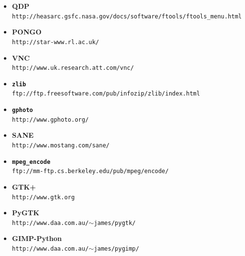 \documentclass[twoside,11pt]{article}
\newcommand{\htmladdnormallink}[2]{#1}
\begin{document}
\begin{itemize}
\item {\bf\label{sc15_available_qdp}QDP}\\
\htmladdnormallink{{\tt http://heasarc.gsfc.nasa.gov/docs/software/ftools/ftools\_menu.html}}{http://heasarc.gsfc.nasa.gov/docs/software/ftools/ftools\_menu.html}
 
\item {\bf\label{sc15_available_pongo}PONGO}\\
\htmladdnormallink{{\tt http://star-www.rl.ac.uk/}}{http://star-www.rl.ac.uk/}  

\item {\bf\label{sc15_available_vnc}VNC}\\
\htmladdnormallink{{\tt http://www.uk.research.att.com/vnc/}}{http://www.uk.research.att.com/vnc/} 

\item {\bf\label{sc15_available_zlib}{\tt zlib}}\\
\htmladdnormallink{{\tt ftp://ftp.freesoftware.com/pub/infozip/zlib/index.html}}{ftp://ftp.freesoftware.com/pub/infozip/zlib/index.html} 

\item {\bf\label{sc15_available_gphoto}{\tt gphoto}}\\
\htmladdnormallink{{\tt http://www.gphoto.org/}}{http://www.gphoto.org/} 

\item {\bf\label{sc15_available_sane}SANE}\\
\htmladdnormallink{{\tt http://www.mostang.com/sane/}}{http://www.mostang.com/sane/} 

\item {\bf\label{sc15_available_mpegencode}{\tt mpeg\_encode}}\\
\htmladdnormallink{{\tt ftp://mm-ftp.cs.berkeley.edu/pub/mpeg/encode/}}{ftp://mm-ftp.cs.berkeley.edu/pub/mpeg/encode/} 

\item {\bf\label{sc15_available_gtk+}GTK+}\\
\htmladdnormallink{{\tt http://www.gtk.org}}{http://www.gtk.org} 

\item {\bf\label{sc15_available_pygtk}PyGTK}\\
\htmladdnormallink{{\tt http://www.daa.com.au/$\sim$james/pygtk/}}{http://www.daa.com.au/~james/pygtk/} 

\item {\bf\label{sc15_available_gimppython}GIMP-Python}\\
\htmladdnormallink{{\tt http://www.daa.com.au/$\sim$james/pygimp/}}{http://www.daa.com.au/~james/pygimp/} 


\end{itemize}
\end{document}
